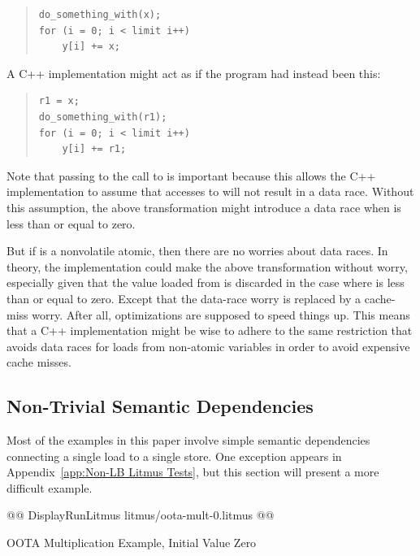 \documentclass[10]{article}
\begin{document}
\begin{quote}
\begin{verbatim}
do_something_with(x);
for (i = 0; i < limit i++)
    y[i] += x;
\end{verbatim}
\end{quote}

A C++ implementation might act as if the program had instead been this:

\begin{quote}
\begin{verbatim}
r1 = x;
do_something_with(r1);
for (i = 0; i < limit i++)
    y[i] += r1;
\end{verbatim}
\end{quote}

Note that passing  to the call to  is important
because this allows the C++ implementation to assume that accesses to 
will not result in a data race.
Without this assumption, the above transformation might introduce a data
race when  is less than or equal to zero.

But if  is a nonvolatile atomic, then there are no worries about
data races.
In theory, the implementation could make the above transformation without
worry, especially given that the value loaded from  is discarded in
the case where  is less than or equal to zero.
Except that the data-race worry is replaced by a cache-miss worry.
After all, optimizations are supposed to speed things up.
This means that a C++ implementation might be wise to adhere to the
same restriction that avoids data races for loads from non-atomic
variables in order to avoid expensive cache misses.

\subsection{Non-Trivial Semantic Dependencies}
\label{app:Non-Trivial Semantic Dependencies}

Most of the examples in this paper involve simple semantic dependencies
connecting a single load to a single store.
One exception appears in
Appendix~\ref{app:Non-LB Litmus Tests},
but this section will present a more difficult example.

\begin{listing}[tbp]
@@ DisplayRunLitmus litmus/oota-mult-0.litmus @@
\caption{OOTA Multiplication Example, Initial Value Zero}
\label{lst:OOTA Multiplication Example, Initial Value Zero}
\end{listing}
\end{document}
